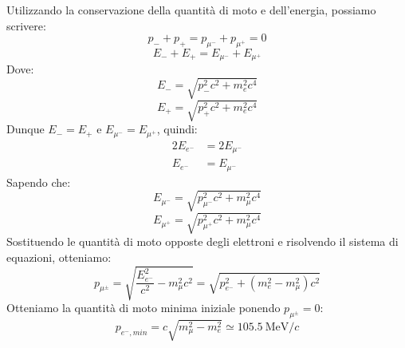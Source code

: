 Utilizzando la conservazione della quantità di moto e dell'energia, possiamo scrivere:
\begin{equation}
 p_- + p_+ = p_{\mu^-} + p_{\mu^+} = 0
\end{equation}
\begin{equation}
 E_- + E_+ = E_{\mu^-} + E_{\mu^+}
\end{equation}
Dove:
\begin{equation}
 E_- = \sqrt{p_-^2 c^2 + m_e^2 c^4}
\end{equation}
\begin{equation}
 E_+ = \sqrt{p_+^2 c^2 + m_e^2 c^4}
\end{equation}
Dunque $E_- = E_+$ e $E_{\mu^-} = E_{\mu^+}$, quindi:
\begin{equation}
 \begin{split}
  2E_{e^-} &= 2E_{\mu^-} \\[8pt]
  E_{e^-} &= E_{\mu^-}
 \end{split}
\end{equation}
Sapendo che:
\begin{equation}
 E_{\mu^-} = \sqrt{p_{\mu^-}^2 c^2 + m_\mu^2 c^4}
\end{equation}
\begin{equation}
 E_{\mu^+} = \sqrt{p_{\mu^+}^2 c^2 + m_\mu^2 c^4}
\end{equation}
Sostituendo le quantità di moto opposte degli elettroni e risolvendo il sistema di equazioni, otteniamo:
\begin{equation}
 p_{\mu^\pm} = \sqrt{\dfrac{E_{e^-}^2}{c^2} - m_\mu^2 c^2} = \sqrt{p_{e^-}^2 + (m_e^2 - m_\mu^2) c^2}
\end{equation}
Otteniamo la quantità di moto minima iniziale ponendo $p_{\mu^\pm} = 0$:
\begin{equation}
 p_{e^-,min} = c \sqrt{m_\mu^2 - m_e^2} \simeq \qty{105.5}{\mega\electronvolt\per c}
\end{equation}
